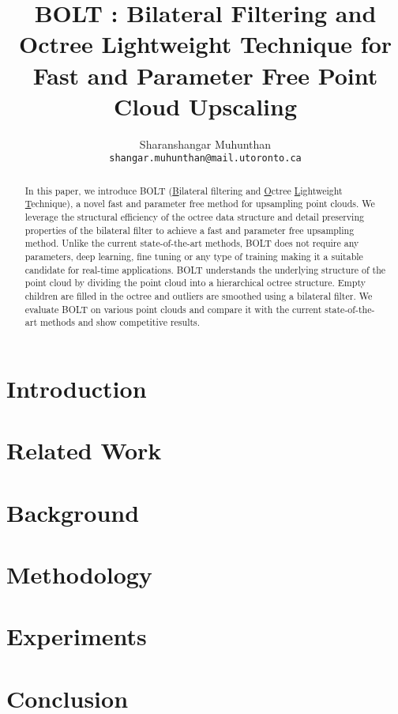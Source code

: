 \documentclass[fleqn, twocolumn]{article}
\author{Sharanshangar Muhunthan \\ \texttt{shangar.muhunthan@mail.utoronto.ca}}
\title{BOLT \emoji{high-voltage}: Bilateral Filtering and Octree Lightweight Technique for Fast and Parameter Free Point Cloud Upscaling}
\begin{document}
\maketitle
\begin{abstract}
	In this paper, we introduce BOLT (\underline{B}ilateral filtering and \underline{O}ctree \underline{L}ightweight \underline{T}echnique), a novel fast and parameter free method for upsampling point clouds.
	We leverage the structural efficiency of the octree data structure and detail preserving properties of the bilateral filter to achieve a fast and parameter free upsampling method.
	Unlike the current state-of-the-art methods, BOLT does not require any parameters, deep learning, fine tuning or any type of training making it a suitable candidate for real-time applications.
	BOLT understands the underlying structure of the point cloud by dividing the point cloud into a hierarchical octree structure. 
	Empty children are filled in the octree and outliers are smoothed using a bilateral filter.
	We evaluate BOLT on various point clouds and compare it with the current state-of-the-art methods and show competitive results.
\end{abstract}

\section{Introduction}



\section{Related Work}



\section{Background}



\section{Methodology}



\section{Experiments}



\section{Conclusion}





\end{document}

